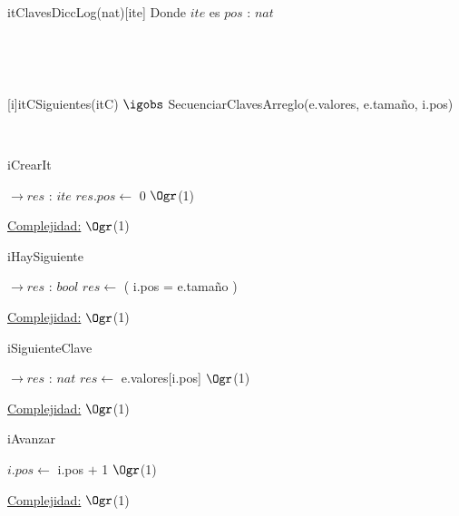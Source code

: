\begin{Representacion}

	\begin{Estructura}{itClavesDiccLog(nat)}[ite]
		Donde $ite$ es $pos$ : $nat$
	\end{Estructura}	
	
~	

	
~

	{itC}{Siguientes(itC) $\igobs$ SecuenciarClavesArreglo(e.valores, e.tamaño, i.pos)}
	
~

	
\end{Representacion}

\begin{Algoritmos}
	
	\begin{algorithm}[H]
		\caption{iCrearIt}
		\begin{algorithmic}
			 $\to res$ : $ite$
				\State $	res.pos \gets$ 0 \Comment $\Ogr$(1)
			\EndProcedure
		\end{algorithmic}
		\underline{Complejidad:} $\Ogr$(1)
	\end{algorithm}	

	\begin{algorithm}[H]
		\caption{iHaySiguiente}
		\begin{algorithmic}
			 $\to res$ : $bool$
				\State $res \gets$ ( i.pos = e.tamaño )	
			\EndProcedure
		\end{algorithmic}
		\underline{Complejidad:} $\Ogr$(1)
	\end{algorithm}
	
	\begin{algorithm}[H]
		\caption{iSiguienteClave}
		\begin{algorithmic}
			 $\to res$ : $nat$
				\State $res \gets$ e.valores[i.pos] \Comment $\Ogr$(1)
			\EndProcedure
		\end{algorithmic}
		\underline{Complejidad:} $\Ogr$(1)
	\end{algorithm}
	
	\begin{algorithm}[H]
		\caption{iAvanzar}
		\begin{algorithmic}
			\Procedure{iAvanzar}{\texttt{in/out} i : \texttt{ite}}
				\State $i.pos \gets$ i.pos $+$ 1 \Comment $\Ogr$(1)
			\EndProcedure
		\end{algorithmic}
		\underline{Complejidad:} $\Ogr$(1)
	\end{algorithm}
	
\end{Algoritmos}